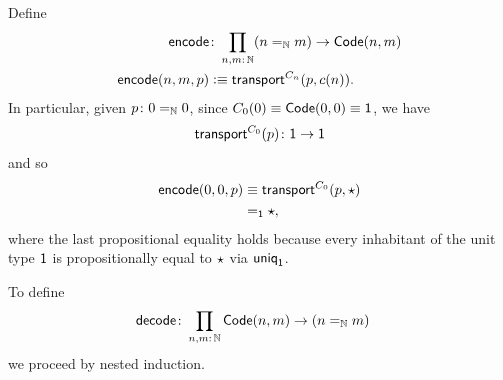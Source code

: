 \begin{description}[font=\normalfont\scshape]
    \item[Encode function.] Define
    \begin{align*}
        \fun{encode}&\colon\prod_{n,m\colon\N}
            (n\eq{\N}m)\to\fun{Code}(n,m)\\
        \fun{encode}(n,m,p)&\defeq\fun{transport}^{C_n}(p,c(n)).
    \end{align*}
    In particular, given $p\colon0\eq\N0$, since $C_0(0)\equiv\mathsf{Code}(0,0)\equiv\mathsf{1}$, we have
    \[
        \fun{transport}^{C_0}(p)\colon\fun1\to\fun1
    \]
    and so
    \begin{align}\label{eq:case-0,0}
        \mathsf{encode}(0,0,p)
            &\equiv\mathsf{transport}^{C_0}(p,\mathsf{\star})
                \nonumber\\
            &\mathrel{=_{\mathsf{1}}}\mathsf{\star},
    \end{align}
    where the last propositional equality holds because every inhabitant of the unit type $\mathsf{1}$ is propositionally equal to $\mathsf{\star}$ via $\mathsf{uniq}_{\mathsf{1}}$.
    

    \item[Decode function.] To define
    \begin{align*}
        \fun{decode}&\colon\prod_{n,m\colon\N}
            \fun{Code}(n,m)\to(n\eq\N m)
    \end{align*}
    we proceed by nested induction.


\end{description}
